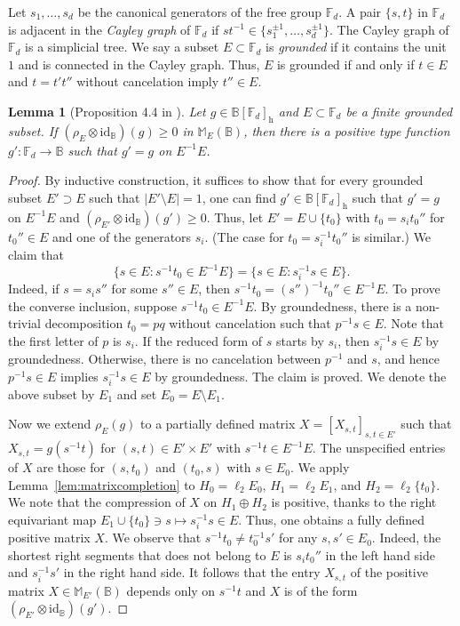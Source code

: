 \documentclass[12pt]{amsart}
\newtheorem{lem}[thm]{Lemma}
\theoremstyle{definition}
\begin{document}
Let $s_1,\ldots,s_d$ be the canonical generators of the free group ${{\mathbb F}}_d$.
A pair $\{s,t\}$ in ${{\mathbb F}}_d$ is adjacent in the \emph{Cayley graph} of ${{\mathbb F}}_d$ if
$st^{-1}\in\{ s_1^{\pm1},\ldots,s_d^{\pm1}\}$.
The Cayley graph of ${{\mathbb F}}_d$ is a simplicial tree.
We say a subset $E\subset{{\mathbb F}}_d$ is \emph{grounded}
if it contains the unit $1$ and is connected in the Cayley graph.
Thus, $E$ is grounded if and only if
$t\in E$ and $t=t't''$ without cancelation imply $t''\in E$.
\begin{lem}[Proposition 4.4 in \cite{bt}]\label{lem:equivextension}
Let $g\in{{\mathbb B}}[{{\mathbb F}}_d]_{\mathrm{h}}$ and $E\subset{{\mathbb F}}_d$ be a finite grounded subset.
If $(\rho_E\otimes{\mathrm{id}}_{{\mathbb B}})(g)\geq0$ in ${{\mathbb M}}_E({{\mathbb B}})$, then there is a positive type function $g'\colon{{\mathbb F}}_d\to{{\mathbb B}}$
such that $g'=g$ on $E^{-1}E$.
\end{lem}
\begin{proof}
By inductive construction, it suffices to show that
for every grounded subset $E'\supset E$ such that $|E'\setminus E|=1$,
one can find $g'\in{{\mathbb B}}[{{\mathbb F}}_d]_{\mathrm{h}}$ such that $g'=g$ on $E^{-1}E$ and $(\rho_{E'}\otimes{\mathrm{id}}_{{\mathbb B}})(g')\geq0$.
Thus, let $E'=E\cup\{ t_0\}$ with $t_0=s_it_0''$ for $t_0''\in E$
and one of the generators $s_i$. (The case for $t_0=s_i^{-1}t_0''$ is similar.)
We claim that
\[
\{ s\in E : s^{-1}t_0 \in E^{-1}E\} = \{ s\in E : s_i^{-1}s\in E\}.
\]
Indeed, if $s=s_is''$ for some $s''\in E$, then $s^{-1}t_0=(s'')^{-1}t_0''\in E^{-1}E$.
To prove the converse inclusion, suppose $s^{-1}t_0\in E^{-1}E$.
By groundedness, there is a non-trivial decomposition $t_0=pq$ without cancelation
such that $p^{-1}s\in E$. Note that the first letter of $p$ is $s_i$.
If the reduced form of $s$ starts by $s_i$, then $s_i^{-1}s\in E$ by groundedness.
Otherwise, there is no cancelation between $p^{-1}$ and $s$, and hence $p^{-1}s\in E$
implies $s_i^{-1}s\in E$ by groundedness. The claim is proved.
We denote the above subset by $E_1$ and set $E_0=E\setminus E_1$.

Now we extend $\rho_E(g)$ to a partially defined matrix $X=[X_{s,t}]_{s,t\in E'}$
such that $X_{s,t}=g(s^{-1}t)$ for $(s,t)\in E'\times E'$ with $s^{-1}t\in E^{-1}E$.
The unspecified entries of $X$
are those for $(s,t_0)$ and $(t_0,s)$ with $s\in E_0$.
We apply Lemma~\ref{lem:matrixcompletion} to
${H}_0=\ell_2 E_0$, ${H}_1=\ell_2 E_1$, and ${H}_2=\ell_2\{t_0\}$.
We note that the compression of $X$ on ${H}_1\oplus{H}_2$ is positive, thanks to
the right equivariant map $E_1\cup\{ t_0 \}\ni s\mapsto s_i^{-1}s\in E$.
Thus, one obtains a fully defined positive matrix $X$.
We observe that $s^{-1}t_0\neq t_0^{-1}s'$ for any $s,s'\in E_0$.
Indeed, the shortest right segments that does not belong to $E$ is
$s_it_0''$ in the left hand side and $s_i^{-1}s'$ in the right hand side.
It follows that the entry $X_{s,t}$ of the positive matrix $X\in{{\mathbb M}}_{E'}({{\mathbb B}})$ depends
only on $s^{-1}t$ and $X$ is of the form $(\rho_{E'}\otimes{\mathrm{id}}_{{\mathbb B}})(g')$.
\end{proof}
\end{document}
